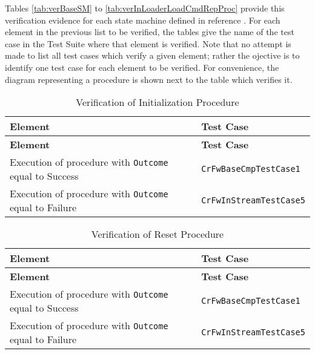 \documentclass{pnp_article}
\begin{document}
Tables \ref{tab:verBaseSM} to \ref{tab:verInLoaderLoadCmdRepProc} provide this verification evidence for each state machine defined in reference \cite{ref:cordetfw}. For each element in the previous list to be verified, the tables give the name of the test case in the Test Suite where that element is verified. Note that no attempt is made to list all test cases which verify a given element; rather the ojective is to identify one test case for each element to be verified. For convenience, the diagram representing a procedure is shown next to the table which verifies it.

\begin{longtable}{|>{\raggedright}p{9.0cm}|P{4.0cm}|}
\caption{Verification of Initialization Procedure}
\label{tab:verInitProc}\\
\hline
{}
\textbf{Element} & \textbf{Test Case} \\
\hline
\endfirsthead
{}
\textbf{Element} & \textbf{Test Case} \\
\hline
\endhead
Execution of procedure with \texttt{Outcome} equal to Success & \texttt{CrFwBaseCmpTestCase1}\\
\hline
Execution of procedure with \texttt{Outcome} equal to Failure & \texttt{CrFwInStreamTestCase5}\\
\hline
\end{longtable}

\begin{longtable}{|>{\raggedright}p{8.0cm}|P{5.0cm}|}
\caption{Verification of Reset Procedure}
\label{tab:verResetProc}\\
\hline
{}
\textbf{Element} & \textbf{Test Case} \\
\hline
\endfirsthead
{}
\textbf{Element} & \textbf{Test Case} \\
\hline
\endhead
Execution of procedure with \texttt{Outcome} equal to Success & \texttt{CrFwBaseCmpTestCase1}\\
\hline
Execution of procedure with \texttt{Outcome} equal to Failure & \texttt{CrFwInStreamTestCase5}\\
\hline
\end{longtable}
\end{document}
